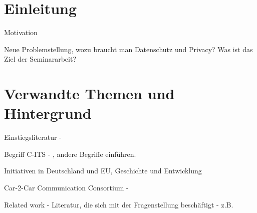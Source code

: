 
\section{Einleitung}
\label{ch:Introduction}


Motivation

Neue Problemstellung, wozu braucht man Datenschutz und Privacy? Was ist das Ziel der Seminararbeit?


\section{Verwandte Themen und Hintergrund}
\label{ch:Citation}

Einstiegsliteratur - 
\cite{Strubbe2017}
\cite{Kiometzis2017}

Begriff C-ITS - \cite{CITS2016}, andere Begriffe einführen.

Initiativen in Deutschland und EU, Geschichte und Entwicklung

Car-2-Car Communication Consortium - \cite{Car2Car}

Related work - Literatur, die sich mit der Fragenstellung beschäftigt - z.B. \cite{Jochum2020}


%


